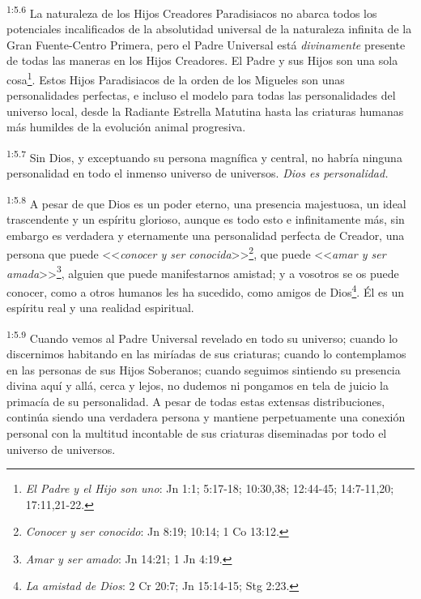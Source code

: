 \par
\textsuperscript{1:5.6} La naturaleza de los Hijos Creadores Paradisiacos no abarca todos los potenciales incalificados de la absolutidad universal de la naturaleza infinita de la Gran Fuente-Centro Primera, pero el Padre Universal está \textit{divinamente} presente de todas las maneras en los Hijos Creadores. El Padre y sus Hijos son una sola cosa\footnote{\textit{El Padre y el Hijo son uno}: Jn 1:1; 5:17-18; 10:30,38; 12:44-45; 14:7-11,20; 17:11,21-22.}. Estos Hijos Paradisiacos de la orden de los Migueles son unas personalidades perfectas, e incluso el modelo para todas las personalidades del universo local, desde la Radiante Estrella Matutina hasta las criaturas humanas más humildes de la evolución animal progresiva.

\par
\textsuperscript{1:5.7} Sin Dios, y exceptuando su persona magnífica y central, no habría ninguna personalidad en todo el inmenso universo de universos. \textit{Dios es personalidad.}

\par
\textsuperscript{1:5.8} A pesar de que Dios es un poder eterno, una presencia majestuosa, un ideal trascendente y un espíritu glorioso, aunque es todo esto e infinitamente más, sin embargo es verdadera y eternamente una personalidad perfecta de Creador, una persona que puede <<\textit{conocer y ser conocida}>>\footnote{\textit{Conocer y ser conocido}: Jn 8:19; 10:14; 1 Co 13:12.}, que puede <<\textit{amar y ser amada}>>\footnote{\textit{Amar y ser amado}: Jn 14:21; 1 Jn 4:19.}, alguien que puede manifestarnos amistad; y a vosotros se os puede conocer, como a otros humanos les ha sucedido, como amigos de Dios\footnote{\textit{La amistad de Dios}: 2 Cr 20:7; Jn 15:14-15; Stg 2:23.}. Él es un espíritu real y una realidad espiritual.

\par
\textsuperscript{1:5.9} Cuando vemos al Padre Universal revelado en todo su universo; cuando lo discernimos habitando en las miríadas de sus criaturas; cuando lo contemplamos en las personas de sus Hijos Soberanos; cuando seguimos sintiendo su presencia divina aquí y allá, cerca y lejos, no dudemos ni pongamos en tela de juicio la primacía de su personalidad. A pesar de todas estas extensas distribuciones, continúa siendo una verdadera persona y mantiene perpetuamente una conexión personal con la multitud incontable de sus criaturas diseminadas por todo el universo de universos.

